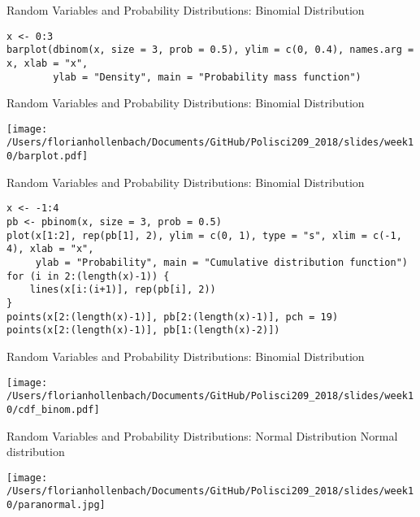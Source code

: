 \documentclass[presentation]{beamer}
\begin{document}
\begin{frame}[fragile,shrink=35,label={sec:orgbacf383}]{Random Variables and Probability Distributions: Binomial Distribution}
 \begin{verbatim}
x <- 0:3
barplot(dbinom(x, size = 3, prob = 0.5), ylim = c(0, 0.4), names.arg = x, xlab = "x",
        ylab = "Density", main = "Probability mass function")
\end{verbatim}
\end{frame}




\begin{frame}[label={sec:orge5f54fc}]{Random Variables and Probability Distributions: Binomial Distribution}
\begin{center}
\texttt{[image: /Users/florianhollenbach/Documents/GitHub/Polisci209\_2018/slides/week10/barplot.pdf]}
\end{center}
\end{frame}


\begin{frame}[fragile,shrink=35,label={sec:orgf725816}]{Random Variables and Probability Distributions: Binomial Distribution}
 \begin{verbatim}
x <- -1:4
pb <- pbinom(x, size = 3, prob = 0.5)
plot(x[1:2], rep(pb[1], 2), ylim = c(0, 1), type = "s", xlim = c(-1, 4), xlab = "x",
     ylab = "Probability", main = "Cumulative distribution function")
for (i in 2:(length(x)-1)) {
    lines(x[i:(i+1)], rep(pb[i], 2))
}
points(x[2:(length(x)-1)], pb[2:(length(x)-1)], pch = 19)
points(x[2:(length(x)-1)], pb[1:(length(x)-2)])
\end{verbatim}
\end{frame}




\begin{frame}[label={sec:orga3c5b81}]{Random Variables and Probability Distributions: Binomial Distribution}
\begin{center}
\texttt{[image: /Users/florianhollenbach/Documents/GitHub/Polisci209\_2018/slides/week10/cdf\_binom.pdf]}
\end{center}
\end{frame}




\begin{frame}[label={sec:orge054b65}]{Random Variables and Probability Distributions: Normal Distribution}
\alert{Normal distribution}

\begin{center}
\texttt{[image: /Users/florianhollenbach/Documents/GitHub/Polisci209\_2018/slides/week10/paranormal.jpg]}
\end{center}
\end{frame}
\end{document}
